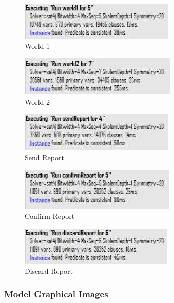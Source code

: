\documentclass{article}
\begin{document}
\begin{figure}[H]
    \centering
    \includegraphics[scale=0.9]{img/alloy/world1.png}
    \caption{World 1}
\end{figure}

\begin{figure}[H]
    \centering
    \includegraphics[scale=0.9]{img/alloy/world2.png}
    \caption{World 2}
\end{figure}

\begin{figure}[H]
    \centering
    \includegraphics[scale=0.9]{img/alloy/sendReport.png}
    \caption{Send Report}
\end{figure}

\begin{figure}[H]
    \centering
    \includegraphics[scale=0.9]{img/alloy/confirmReport.png}
    \caption{Confirm Report}
\end{figure}

\begin{figure}[H]
    \centering
    \includegraphics[scale=0.9]{img/alloy/discardReport.png}
    \caption{Discard Report}
\end{figure}

\clearpage

\subsubsection{Model Graphical Images}
\end{document}

